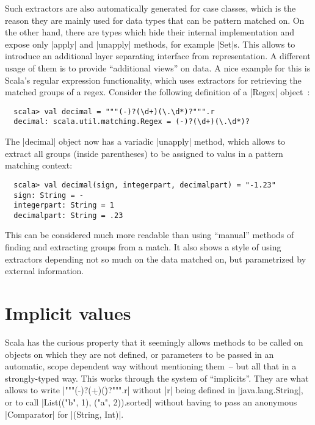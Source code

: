 Such extractors are also automatically generated for case classes, which is the reason they are
mainly used for data types that can be pattern matched on. On the other hand, there are types which
hide their internal implementation and expose only |apply| and |unapply| methods, for example
|Set|s. This allows to introduce an additional layer separating interface from representation.  A
different usage of them is to provide \enquote{additional views} on data. A nice example for this is
Scala's regular expression functionality, which uses extractors for retrieving the matched groups of
a regex. Consider the following definition of a |Regex| object~\cite[][p.~611]{odersky2008:programming}:
\begin{lstlisting}
  scala> val decimal = """(-)?(\d+)(\.\d*)?""".r
  decimal: scala.util.matching.Regex = (-)?(\d+)(\.\d*)?
\end{lstlisting}
The |decimal| object now has a variadic |unapply| method, which allows to extract all groups (inside
parentheses) to be assigned to valus in a pattern matching context:
\begin{lstlisting}
  scala> val decimal(sign, integerpart, decimalpart) = "-1.23"
  sign: String = -
  integerpart: String = 1
  decimalpart: String = .23
\end{lstlisting}
This can be considered much more readable than using \enquote{manual} methods of finding and
extracting groups from a match. It also shows a style of using extractors depending not so much on
the data matched on, but parametrized by external information.

\section{Implicit values}
\label{sec:implicits}

Scala has the curious property that it seemingly allows methods to be called on objects on which
they are not defined, or parameters to be passed in an automatic, scope dependent way without
mentioning them~-- but all that in a strongly-typed way. This works through the system of
\enquote{implicits}. They are what allows to write |"""(-)?(\d+)(\.\d*)?""".r| without |r| being
defined in |java.lang.String|, or to call |List(("b", 1), ("a", 2)).sorted| without having to pass
an anonymous |Comparator| for |(String, Int)|.

